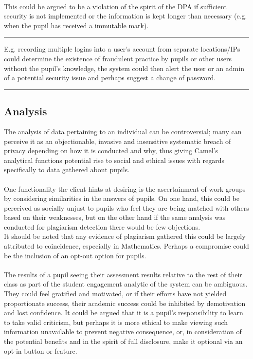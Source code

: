 \\This could be argued to be a violation of the spirit of the DPA if sufficient security is not implemented or the information is kept longer than necessary (e.g. when the pupil has received a immutable mark).
\vspace{0.35cm} \hrule {\raggedleft \scriptsize E.g. recording multiple logins into a user’s account from separate locations/IPs could determine the existence of fraudulent practice by pupils or other users without the pupil’s knowledge, the system could then alert the user or an admin of a potential security issue and perhaps suggest a change of password.\par} \vspace{0.35cm} \hrule
{}
\subsection*{Analysis}
The analysis of data pertaining to an individual can be controversial; many can perceive it as an objectionable, invasive and insensitive systematic breach of privacy depending on how it is conducted and why, thus giving Camel’s analytical functions potential rise to social and ethical issues with regards specifically to data gathered about pupils.
\\\\One functionality the client hints at desiring is the ascertainment of work groups by considering similarities in the answers of pupils. On one hand, this could be perceived as socially unjust to pupils who feel they are being matched with others based on their weaknesses, but on the other hand if the same analysis was conducted for plagiarism detection there would be few objections.
\\It should be noted that any evidence of plagiarism gathered this could be largely attributed to coincidence, especially in Mathematics. Perhaps a compromise could be the inclusion of an opt-out option for pupils.
\\\\The results of a pupil seeing their assessment results relative to the rest of their class as part of the student engagement analytic of the system can be ambiguous. They could feel gratified and motivated, or if their efforts have not yielded proportionate success, their academic success could be inhibited by demotivation and lost confidence. It could be argued that it is a pupil's responsibility to learn to take valid criticism, but perhaps it is more ethical to make viewing such information unavailable to prevent negative consequence, or, in consideration of the potential benefits and in the spirit of full disclosure, make it optional via an opt-in button or feature.
